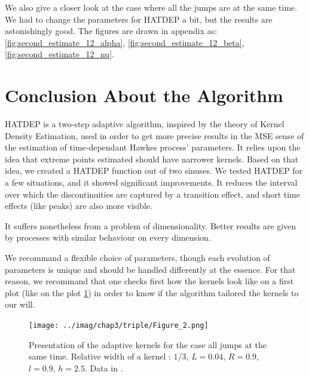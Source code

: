We also give a closer look at the case where all the jumps are at the same time. We had to change the parameters for HATDEP a bit, but the results are astonishingly good. The figures are drawn in appendix as: \ref{fig:second_estimate_12_alpha}, \ref{fig:second_estimate_12_beta}, \ref{fig:second_estimate_12_nu}.




\section{Conclusion About the Algorithm}
HATDEP is a two-step adaptive algorithm, inspired by the theory of Kernel Density Estimation, used in order to get more precise results in the MSE sense of the estimation of time-dependant Hawkes process' parameters. It relies upon the idea that extreme points estimated should have narrower kernels. Based on that idea, we created a HATDEP function out of two sinuses. We tested HATDEP for a few situations, and it showed significant improvements. It reduces the interval over which the discontinuities are captured by a transition effect, and short time effects (like peaks) are also more visible.

It suffers nonetheless from a problem of dimensionality. Better results are given by processes with similar behaviour on every dimension.

We recommand a flexible choice of parameters, though each evolution of parameters is unique and should be handled differently at the essence. For that reason, we recommand that one checks first how the kernels look like on a first plot (like on the plot \ref{fig:essential_check_triple}) in order to know if the algorithm tailored the kernels to our will.

\begin{figure}
\centering
\texttt{[image: ../imag/chap3/triple/Figure\_2.png]}
\caption{Presentation of the adaptive kernels for the case all jumps at the same time. Relative width of a kernel : $1/3$, $L = 0.04$, $R = 0.9$, $l = 0.9$, $h = 2.5$. Data in \protect {}.}
\label{fig:essential_check_triple}
\end{figure}
